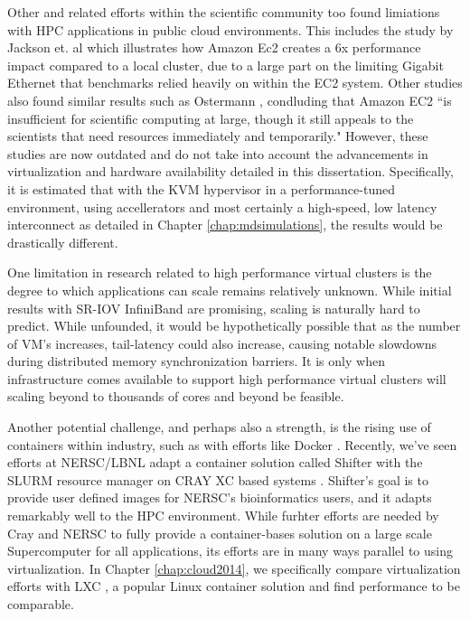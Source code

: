 Other and related efforts within the scientific community too found limiations with HPC applications in public cloud environments. This includes the study by Jackson et. al \cite{jackson2010performance} which illustrates how Amazon Ec2 creates a 6x performance impact compared to a local cluster, due to a large part on the limiting Gigabit Ethernet that benchmarks relied heavily on within the EC2 system. Other studies also found similar results such as Ostermann \cite{ostermann2009performance}, condluding that Amazon EC2 ``is insufficient for scientific computing at large, though it still appeals to the scientists that need resources immediately and temporarily."  However, these studies are now outdated and do not take into account the advancements in virtualization and hardware availability detailed in this dissertation. Specifically, it is estimated that with the KVM hypervisor in a performance-tuned environment, using accellerators and most certainly a high-speed, low latency interconnect as detailed in Chapter \ref{chap:mdsimulations}, the results would be drastically different. 


One limitation in research related to high performance virtual clusters is the degree to which applications can scale remains relatively unknown. While initial results with SR-IOV InfiniBand are promising, scaling is naturally hard to predict. While unfounded, it would be hypothetically possible that as the number of VM's increases, tail-latency could also increase, causing notable slowdowns during distributed memory synchronization barriers. It is only when infrastructure comes available to support high performance virtual clusters will scaling beyond to thousands of cores and beyond be feasible.  

Another potential challenge, and perhaps also a strength, is the rising use of containers within industry, such as with efforts like Docker \cite{merkel2014docker}. Recently, we've seen efforts at NERSC/LBNL adapt a container solution called Shifter with the SLURM resource manager on CRAY XC based systems \cite{jacobsen2015contain}. Shifter's goal is to provide user defined images for NERSC's bioinformatics users, and it adapts remarkably well to the HPC environment. While furhter efforts are needed by Cray and NERSC to fully provide a container-bases solution on a large scale Supercomputer for all applications, its efforts are in many ways parallel to using virtualization. In Chapter \ref{chap:cloud2014}, we specifically compare virtualization efforts with LXC \cite{containers}, a popular Linux container solution and find performance to be comparable.  

